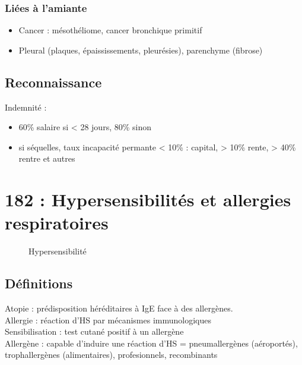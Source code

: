 \documentclass{article}
\begin{document}
\subsubsection{Liées à l'amiante}
\begin{itemize}
  \item Cancer : mésothéliome, cancer bronchique primitif
  \item Pleural (plaques, épaississements, pleurésies), parenchyme (fibrose)
\end{itemize}
\subsection{Reconnaissance}
Indemnité : 
\begin{itemize}
  \item 60\% salaire si < 28 jours, 80\% sinon
  \item si séquelles, taux incapacité permante < 10\% : capital, > 10\% rente, > 40\%
    rentre et autres
\end{itemize}

\section{182 : Hypersensibilités et allergies respiratoires}%
\label{sec:182_hypersensibilites_et_allergies_respiratoires}

\begin{figure}[htpb]
  \centering
  \caption{Hypersensibilité}
\end{figure}
\subsection{Définitions}%
Atopie : prédisposition héréditaires à IgE face à des allergènes.\\
Allergie : réaction d'HS par mécanismes immunologiques\\
Sensibilisation : test cutané positif à un allergène\\
Allergène : capable d'induire une réaction d'HS = pneumallergènes (aéroportés),
trophallergènes (alimentaires), profesionnels, recombinants
\end{document}
